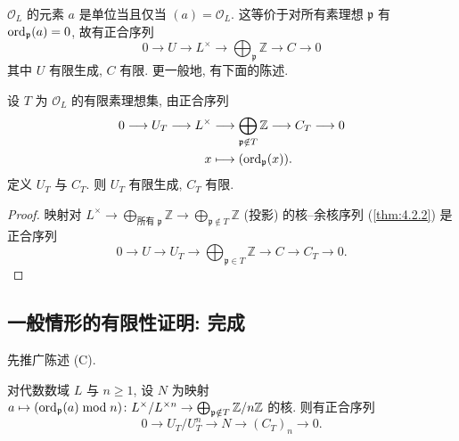 $\mathcal{O}_L$ 的元素 $a$ 是单位当且仅当 $(a) = \mathcal{O}_L$. 这等价于对所有素理想 $\mathfrak{p}$ 有 $\operatorname*{ord}\nolimits_\mathfrak{p}(a) = 0$, 故有正合序列
\[
0\to U\to L^{\times}\to\bigoplus_{\mathfrak{p}}\mathbb{Z}\to C\to 0
\]
其中 $U$ 有限生成, $C$ 有限. 更一般地, 有下面的陈述.

\begin{corollary} \label{thm:4.3.12} 
设 $T$ 为 $\mathcal{O}_L$ 的有限素理想集, 由正合序列
\begin{align*}
    0\longrightarrow U_T\longrightarrow L^{\times}& \longrightarrow\bigoplus_{\mathfrak{p}\notin T}\mathbb{Z}\longrightarrow C_T\longrightarrow 0\\
    x & \longmapsto (\operatorname*{ord}\nolimits_\mathfrak{p}(x)).
\end{align*}
定义 $U_T$ 与 $C_T$. 则 $U_T$ 有限生成, $C_T$ 有限.
\end{corollary}

\begin{proof}
映射对 $L^{\times}\longrightarrow\bigoplus_{\text{所有 }\mathfrak{p}}\mathbb{Z}\longrightarrow\bigoplus_{\mathfrak{p}\notin T}\mathbb{Z}$ (投影) 的核--余核序列 (\ref{thm:4.2.2}) 是正合序列
\[
0\longrightarrow U\longrightarrow U_T\longrightarrow\bigoplus_{\mathfrak{p}\in T}\mathbb{Z}\longrightarrow C\longrightarrow C_T\longrightarrow 0.
\]
\end{proof}

\subsection*{一般情形的有限性证明: 完成}

先推广陈述 (C).

\begin{proposition} \label{thm:4.3.13} 
对代数数域 $L$ 与 $n\ge 1$, 设 $N$ 为映射 $a\mapsto(\operatorname*{ord}\nolimits_\mathfrak{p}(a)\bmod n)\colon L^{\times}/L^{\times n}\to\bigoplus_{\mathfrak{p}\notin T}\mathbb{Z}/n\mathbb{Z}$ 的核. 则有正合序列
\[
0\to U_T/U_T^n\to N\to(C_T)_n\to 0.
\]
\end{proposition}


